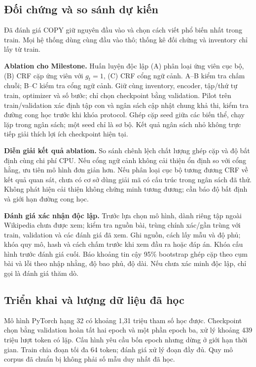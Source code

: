 \documentclass{article}
\begin{document}
\subsection{Đối chứng và so sánh dự kiến}
Đã đánh giá COPY giữ nguyên đầu vào và chọn cách viết phổ biến nhất trong train. Mọi hệ thống dùng cùng đầu vào thô; thống kê đối chứng và inventory chỉ lấy từ train.

\textbf{Ablation cho Milestone.} Huấn luyện độc lập (A) phân loại ứng viên cục bộ, (B) CRF cặp ứng viên với $g_t=1$, (C) CRF cổng ngữ cảnh. A--B kiểm tra chấm chuỗi; B--C kiểm tra cổng ngữ cảnh. Giữ cùng inventory, encoder, tập/thứ tự train, optimizer và số bước; chỉ chọn checkpoint bằng validation. Pilot trên train/validation xác định tập con và ngân sách cập nhật chung khả thi, kiểm tra đường cong học trước khi khóa protocol. Ghép cặp seed giữa các biến thể, chạy lặp trong ngân sách; một seed chỉ là sơ bộ. Kết quả ngân sách nhỏ không trực tiếp giải thích lợi ích checkpoint hiện tại.

\textbf{Diễn giải kết quả ablation.} So sánh chênh lệch chất lượng ghép cặp và độ bất định cùng chi phí CPU. Nếu cổng ngữ cảnh không cải thiện ổn định so với cổng hằng, ưu tiên mô hình đơn giản hơn. Nếu phân loại cục bộ tương đương CRF về kết quả quan sát, chưa có cơ sở dùng giải mã có cấu trúc trong ngân sách đã thử. Không phát hiện cải thiện không chứng minh tương đương; cần báo độ bất định và giới hạn đường cong học.

\textbf{Đánh giá xác nhận độc lập.} Trước lựa chọn mô hình, dành riêng tập ngoài Wikipedia chưa được xem; kiểm tra nguồn bài, trùng chính xác/gần trùng với train, validation và các đánh giá đã xem. Ghi nguồn, cách lấy mẫu và độ phủ; khóa quy mô, hash và cách chấm trước khi xem đầu ra hoặc đáp án. Khóa cấu hình trước đánh giá cuối. Báo khoảng tin cậy 95\% bootstrap ghép cặp theo cụm bài và lỗi theo nhập nhằng, độ bao phủ, độ dài. Nếu chưa xác minh độc lập, chỉ gọi là đánh giá thăm dò.

\subsection{Triển khai và lượng dữ liệu đã học}
Mô hình PyTorch hạng 32 có khoảng 1,31 triệu tham số học được. Checkpoint chọn bằng validation hoàn tất hai epoch và một phần epoch ba, xử lý khoảng 439 triệu lượt token có lặp. Cấu hình yêu cầu bốn epoch nhưng dừng ở giới hạn thời gian. Train chia đoạn tối đa 64 token; đánh giá xử lý đoạn đầy đủ. Quy mô corpus đã chuẩn bị không phải số mẫu duy nhất đã học.
\end{document}
